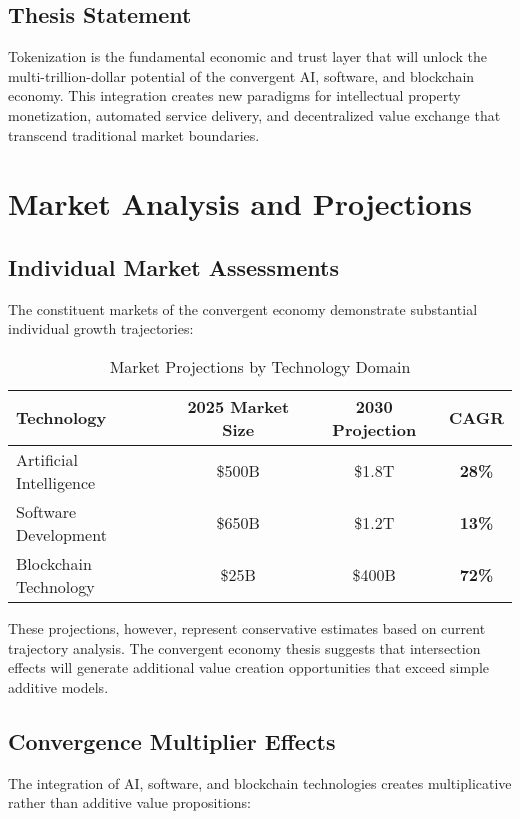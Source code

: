 \documentclass[11pt]{article}
\newcommand{\cagr}[1]{\textcolor{primaryblue}{\textbf{#1\%}}}
\begin{document}
\subsection{Thesis Statement}

Tokenization is the fundamental economic and trust layer that will unlock the multi-trillion-dollar potential of the convergent AI, software, and blockchain economy. This integration creates new paradigms for intellectual property monetization, automated service delivery, and decentralized value exchange that transcend traditional market boundaries.

\section{Market Analysis and Projections}

\subsection{Individual Market Assessments}

The constituent markets of the convergent economy demonstrate substantial individual growth trajectories:

\begin{table}[h]
\centering
\caption{Market Projections by Technology Domain}
\begin{tabular}{@{}lccc@{}}
\toprule
Technology & 2025 Market Size & 2030 Projection & CAGR \\
\midrule
Artificial Intelligence & \$500B & \$1.8T & \cagr{28} \\
Software Development & \$650B & \$1.2T & \cagr{13} \\
Blockchain Technology & \$25B & \$400B & \cagr{72} \\
\bottomrule
\end{tabular}
\end{table}

These projections, however, represent conservative estimates based on current trajectory analysis. The convergent economy thesis suggests that intersection effects will generate additional value creation opportunities that exceed simple additive models.

\subsection{Convergence Multiplier Effects}

The integration of AI, software, and blockchain technologies creates multiplicative rather than additive value propositions:
\end{document}
